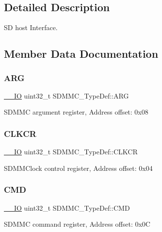 \subsection{Detailed Description}
SD host Interface. 

\subsection{Member Data Documentation}
\mbox{\label{struct_s_d_m_m_c___type_def_aa4a8ca4a55a6c1b0d2837bb1490efea6}} 
\subsubsection{\texorpdfstring{ARG}{ARG}}
{\footnotesize\ttfamily \mbox{\hyperlink{core__sc300_8h_aec43007d9998a0a0e01faede4133d6be}{\+\_\+\+\_\+\+IO}} uint32\+\_\+t S\+D\+M\+M\+C\+\_\+\+Type\+Def\+::\+A\+RG}

S\+D\+M\+MC argument register, Address offset\+: 0x08 \mbox{\label{struct_s_d_m_m_c___type_def_ac432d7f247e2f199f387a9d81a70dbe3}} 
\subsubsection{\texorpdfstring{CLKCR}{CLKCR}}
{\footnotesize\ttfamily \mbox{\hyperlink{core__sc300_8h_aec43007d9998a0a0e01faede4133d6be}{\+\_\+\+\_\+\+IO}} uint32\+\_\+t S\+D\+M\+M\+C\+\_\+\+Type\+Def\+::\+C\+L\+K\+CR}

S\+D\+M\+M\+Clock control register, Address offset\+: 0x04 \mbox{\label{struct_s_d_m_m_c___type_def_ad67342999b4fb5e7c7249935ea96d02f}} 
\subsubsection{\texorpdfstring{CMD}{CMD}}
{\footnotesize\ttfamily \mbox{\hyperlink{core__sc300_8h_aec43007d9998a0a0e01faede4133d6be}{\+\_\+\+\_\+\+IO}} uint32\+\_\+t S\+D\+M\+M\+C\+\_\+\+Type\+Def\+::\+C\+MD}

S\+D\+M\+MC command register, Address offset\+: 0x0C \mbox{\label{struct_s_d_m_m_c___type_def_a8f6c92b986930f9f8a9f9ec3b557bb9a}} 
